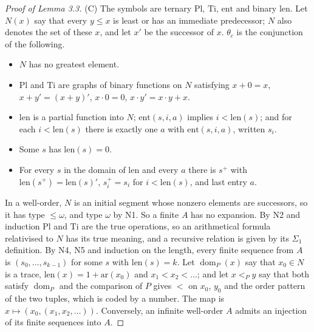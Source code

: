 \documentclass[11pt]{article}
\begin{document}
\begin{proof}[Proof of Lemma 3.3] (C) The symbols are ternary $\mathrm{Pl}$, $\mathrm{Ti}$, $\mathrm{ent}$ and binary $\mathrm{len}$.
Let $N(x)$ say that every $y \le x$ is least or has an immediate predecessor; $N$ also denotes the set of these $x$, and let $x'$ be the successor of $x$.
$\theta_c$ is the conjunction of the following.
\begin{itemize}
\item[N1.] $N$ has no greatest element.
\item[N2.] $\mathrm{Pl}$ and $\mathrm{Ti}$ are graphs of binary functions on $N$ satisfying $x + 0 = x$,
  $x + y' = (x + y)'$, $x \cdot 0 = 0$, $x \cdot y' = x \cdot y + x$.
\item[N3.] $\mathrm{len}$ is a partial function into $N$; $\mathrm{ent}(s, i, a)$ implies $i < \mathrm{len}(s)$; and
  for each $i < \mathrm{len}(s)$ there is exactly one $a$ with $\mathrm{ent}(s, i, a)$, written $s_i$.
\item[N4.] Some $s$ has $\mathrm{len}(s) = 0$.
\item[N5.] For every $s$ in the domain of $\mathrm{len}$ and every $a$ there is $s^+$ with
  $\mathrm{len}(s^+) = \mathrm{len}(s)'$, $s^+_i = s_i$ for $i < \mathrm{len}(s)$, and last entry $a$.
\end{itemize}
In a well-order, $N$ is an initial segment whose nonzero elements are successors, so it has type $\le \omega$, and
type $\omega$ by N1. So a finite $A$ has no expansion. By N2 and induction $\mathrm{Pl}$ and $\mathrm{Ti}$ are the
true operations, so an arithmetical formula relativised to $N$ has its true meaning, and a recursive relation is
given by its $\Sigma_1$ definition. By N4, N5 and induction on the length, every finite sequence from $A$ is
$(s_0, \dots, s_{k-1})$ for some $s$ with $\mathrm{len}(s) = k$. Let $\operatorname{dom}_P(x)$ say that
$x_0 \in N$ is a trace, $\mathrm{len}(x) = 1 + \mathrm{ar}(x_0)$ and $x_1 < x_2 < \dots$; and let $x <_P y$ say
that both satisfy $\operatorname{dom}_P$ and the comparison of $P$ gives $<$ on $x_0$, $y_0$ and the order pattern
of the two tuples, which is coded by a number. The map is $x \mapsto (x_0, (x_1, x_2, \dots))$. Conversely, an
infinite well-order $A$ admits an injection of its finite sequences into $A$.


\end{proof}
\end{document}
